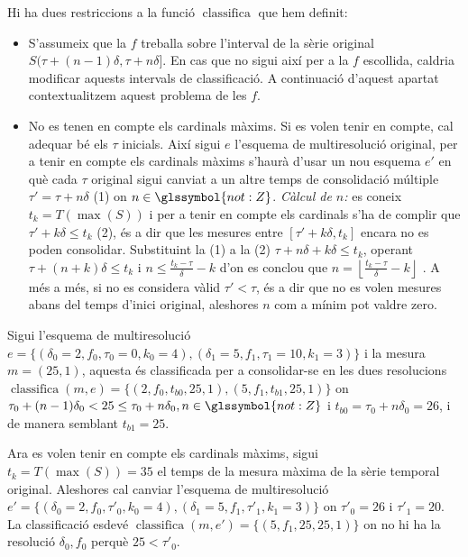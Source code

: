 Hi ha dues restriccions a la funció $\operatorname{classifica}$ que
hem definit: 
\begin{itemize}

\item S'assumeix que la $f$ treballa sobre l'interval de la sèrie
  original $S(\tau+(n-1)\delta ,\tau+n\delta]$. En cas que no sigui
  així per a la $f$ escollida, caldria modificar aquests intervals de
  classificació. A continuació d'aquest apartat contextualitzem aquest
  problema de les $f$.

\item No es tenen en compte els cardinals màxims. Si es volen tenir en
  compte, cal adequar bé els $\tau$ inicials. Així sigui $e$ l'esquema
  de multiresolució original, per a tenir en compte els cardinals
  màxims s'haurà d'usar un nou esquema $e'$ en què cada $\tau$
  original sigui canviat a un altre temps de consolidació múltiple
  $\tau'= \tau+n\delta$ (1) on $n\in\glssymbol{not:Z}$.  \emph{Càlcul
    de $n$:} es coneix $t_k=T(\max(S))$ i per a tenir en compte els
  cardinals s'ha de complir que $\tau'+k\delta \leq t_k$ (2), és a dir
  que les mesures entre $[\tau'+k\delta,t_k]$ encara no es poden
  consolidar.  Substituint la (1) a la (2) $\tau+n\delta+k\delta \leq
  t_k$, operant $\tau+(n+k)\delta \leq t_k$ i $n \leq
  \frac{t_k-\tau}{\delta}-k$ d'on es conclou que $n = \left\lfloor
    \frac{t_k-\tau}{\delta}-k \right\rfloor$ .  A més a més, si no es
  considera vàlid $\tau'<\tau$, és a dir que no es volen mesures abans
  del temps d'inici original, aleshores $n$ com a mínim pot valdre
  zero. \label{def:mapreduce:ajustamentdetaus} 

\end{itemize}



\begin{example}
  \label{ex:mapreduce:classifica}
  Sigui l'esquema de multiresolució
  $e=\{(\delta_0=2,f_0,\tau_0=0,k_0=4),(\delta_1=5,f_1,\tau_1=10,k_1=3)\}$
  i la mesura $m=(25,1)$, aquesta és classificada per a consolidar-se
  en les dues resolucions $\operatorname{classifica}(m,e)=\{
  (2,f_0,t_{b0},25,1), (5,f_1,t_{b1},25,1) \}$ on
  $\tau_0+(n-1)\delta_0 < 25 \leq \tau_0+n\delta_0,
  n\in\glssymbol{not:Z}$ i $t_{b0}=\tau_0+n\delta_0 = 26$, i de manera
  semblant $t_{b1}= 25$.

  Ara es volen tenir en compte els cardinals màxims, sigui
  $t_k=T(\max(S))=35$ el temps de la mesura màxima de la sèrie
  temporal original. Aleshores cal canviar l'esquema de multiresolució
  $e'=\{(\delta_0=2,f_0,\tau'_0,k_0=4),(\delta_1=5,f_1,\tau'_1,k_1=3)\}$
  on $\tau'_0=26$ i $\tau'_1=20$. La classificació esdevé
  $\operatorname{classifica}(m,e')=\{ (5,f_1,25,25,1) \}$ on no hi ha
  la resolució $\delta_0,f_0$ perquè $25< \tau'_0$.
\end{example}





